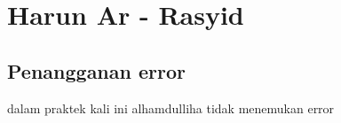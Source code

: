 \section{Harun Ar - Rasyid}
\subsection{Penangganan error}
dalam praktek kali ini alhamdulliha tidak menemukan error